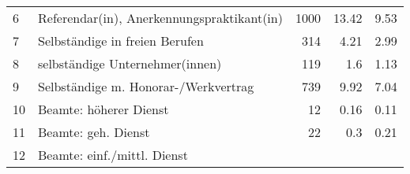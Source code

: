 \begin{longtable}{lXrrr}
     6 &
     \multicolumn{1}{X}{ Referendar(in), Anerkennungspraktikant(in)   } &


       \num{1000} &
       \num[round-mode=places,round-precision=2]{13,42} &
         \num[round-mode=places,round-precision=2]{9,53} \\

     7 &
     \multicolumn{1}{X}{ Selbständige in freien Berufen   } &


       \num{314} &
       \num[round-mode=places,round-precision=2]{4,21} &
         \num[round-mode=places,round-precision=2]{2,99} \\

     8 &
     \multicolumn{1}{X}{ selbständige Unternehmer(innen)   } &


       \num{119} &
       \num[round-mode=places,round-precision=2]{1,6} &
         \num[round-mode=places,round-precision=2]{1,13} \\

     9 &
     \multicolumn{1}{X}{ Selbständige m. Honorar-/Werkvertrag   } &


       \num{739} &
       \num[round-mode=places,round-precision=2]{9,92} &
         \num[round-mode=places,round-precision=2]{7,04} \\

     10 &
     \multicolumn{1}{X}{ Beamte: höherer Dienst   } &


       \num{12} &
       \num[round-mode=places,round-precision=2]{0,16} &
         \num[round-mode=places,round-precision=2]{0,11} \\

     11 &
     \multicolumn{1}{X}{ Beamte: geh. Dienst   } &


       \num{22} &
       \num[round-mode=places,round-precision=2]{0,3} &
         \num[round-mode=places,round-precision=2]{0,21} \\

     12 &
     \multicolumn{1}{X}{ Beamte: einf./mittl. Dienst   } &



\end{longtable}
